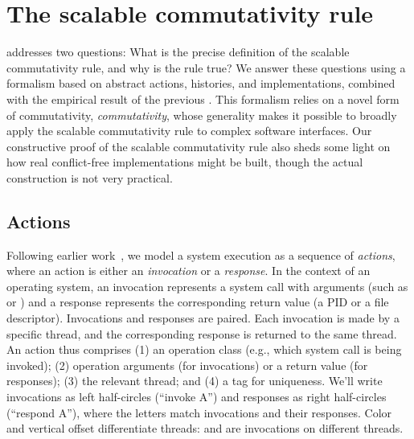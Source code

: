 \section{The scalable commutativity rule}
\label{sec:rule}


 addresses two questions: What is the precise
definition of the scalable commutativity rule, and why is the rule
true?
%
We answer these questions using a formalism based on abstract actions,
histories,
and implementations, combined with the empirical result of the
previous .
%
This formalism relies on a novel form of commutativity, \emph{\SIM
  commutativity}, whose generality makes it possible to broadly apply
the scalable
commutativity rule to complex software interfaces.
%
Our constructive proof of the scalable commutativity rule
also sheds some light on how real conflict-free implementations might be
built, though the actual construction is not very practical.


\subsection{Actions}

Following earlier work~\cite{herlihy:linearizability}, 
we model a system execution
as a sequence of \emph{actions}, where an action is either an
\emph{invocation} or a \emph{response}.
%
In the context of an operating system, an invocation represents a system
call with arguments (such as  or ) and a
response represents the corresponding return value (a PID or a file
descriptor).
%
Invocations and responses are paired. Each invocation is made by a
specific thread, and the corresponding response is returned to the same
thread.
%
An action thus comprises (1) an operation class (e.g., which system
call is being invoked); (2) operation arguments (for invocations) or
a return value (for responses); (3) the relevant thread;
and (4) a tag for uniqueness.
%
We'll write invocations as left half-circles 
(``invoke A'') and responses as right half-circles
 (``respond A''), where the letters match
invocations and their responses.
%
Color and vertical offset differentiate threads:
 and  are invocations on
different threads.


